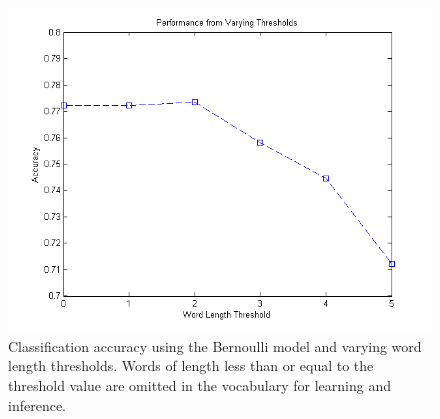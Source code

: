 \documentclass[12pt]{article}
\begin{document}
\begin{figure}[!t]
  \centering
  \includegraphics[scale=.70]{img/vocabthreshold.png}
  \caption{Classification accuracy using the Bernoulli model and varying word length thresholds. Words of length less than or equal to the threshold value are omitted in the vocabulary for learning and inference.}
  \label{fig:vocabthreshold}
\end{figure}
\end{document}
